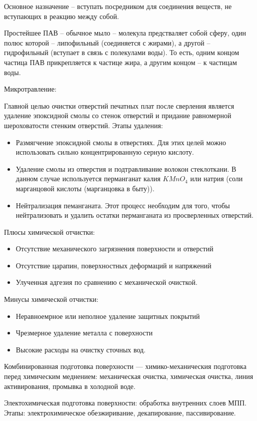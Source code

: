 \documentclass{article}
\begin{document}
Основное назначение -- вступать посредником для соединения веществ, не вступающих в реакцию между собой.

Простейшее ПАВ -- обычное мыло -- молекула предстваляет собой сферу, один полюс которой -- липофильный (соединяется с жирами), а другой -- гидрофильный (вступает в связь с полекулами воды). То есть, одним концом частица ПАВ прикрепляется к частице жира, а другим концом -- к частицам воды.

Микротравление:

Главной целью очистки отверстий печатных плат после сверления является удаление эпоксидной смолы со стенок отверстий и придание равномерной шероховатости стенким отверстий. Этапы удаления:
\begin{itemize}
	\item Размягчение эпоксидной смолы в отверстиях. Для этих целей можно использовать сильно концентрированную серную кислоту.
	\item Удаление смолы из отверстия и подтравливание волокон стеклоткани. В данном случае используется перманганат калия $KMnO_4$ или натрия (соли марганцовой кислоты (марганцовка в быту)).
	\item Нейтрализация пеманганата. Этот процесс необходим для того, чтобы нейтрализовать и удалить остатки перманганата из просверленных отверстий.
\end{itemize}

Плюсы химической отчистки:
\begin{itemize}
	\item Отсутствие механического загрязнения поверхности и отверстий
	\item Отсутствие царапин, поверхностных деформаций и напряжений
	\item Улученная адгезия по сравнению с механической очисткой.
\end{itemize}
Минусы химической отчистки:
\begin{itemize}
	\item Неравноемрное или неполное удаление защитных покрытий
	\item Чрезмерное удаление металла с поверхности
	\item Высокие расходы на очистку сточных вод.
\end{itemize}

Комбинированная подготовка поверхности --- химико-механическия подготовка перед химическим меднением: механическая очистка, химическая очистка, линия активирования, промывка в холодной воде.

Электохимическая подготовка поверхности: обработка внутренних слоев МПП. Этапы: электрохимическое обезжиривание, декапирование, пассивирование.
\end{document}
